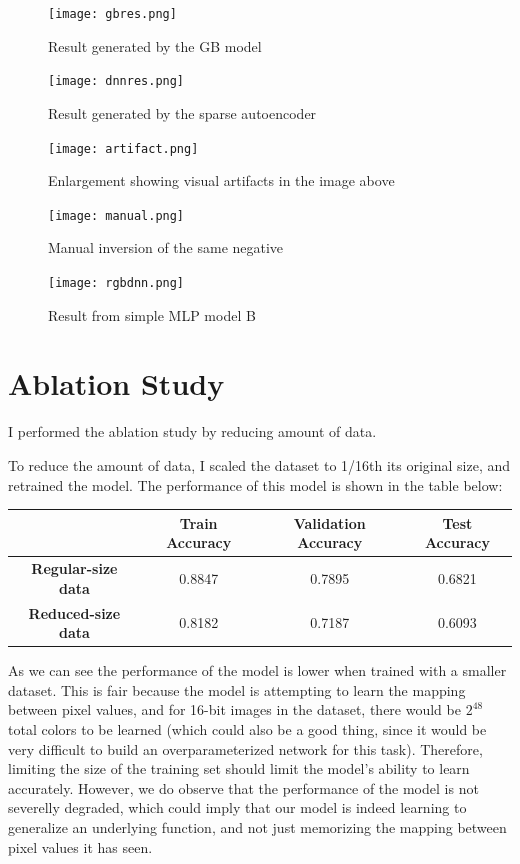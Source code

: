 \documentclass[twoside,11pt]{article}
\begin{document}
\begin{figure}
	\centering
	\texttt{[image: gbres.png]}
	\caption{Result generated by the GB model}
	\texttt{[image: dnnres.png]}
	\caption{Result generated by the sparse autoencoder}
	\texttt{[image: artifact.png]}
	\caption{Enlargement showing visual artifacts in the image above}
	\label{fig:res}
\end{figure}

\begin{figure}
	\centering
	\texttt{[image: manual.png]}
	\caption{Manual inversion of the same negative}
	\texttt{[image: rgbdnn.png]}
	\caption{Result from simple MLP model B}
\end{figure}
\section{Ablation Study}
\label{sec:ablation}
I performed the ablation study by reducing amount of data.

To reduce the amount of data, I scaled the dataset to 1/16th its original size, and retrained the model. 
The performance of this model is shown in the table below:

\begin{center}
	\begin{tabular}{ c|c|c|c }
	 &  \textbf{Train Accuracy}& \textbf{Validation Accuracy} & \textbf{Test Accuracy} \\
	 \hline
	 \textbf{Regular-size data} & 0.8847 & 0.7895 & 0.6821 \\  
	 \hline
	 \textbf{Reduced-size data} & 0.8182 & 0.7187 & 0.6093 \\

	\end{tabular}
	\end{center}

	As we can see the performance of the model is lower when trained with a smaller dataset. 
	This is fair because the model is attempting to learn the mapping between pixel values, and for 
	16-bit images in the dataset, there would be $2^{48}$ total colors to be learned 
	(which could also be a good thing, since it would be very difficult to build an overparameterized network for this task). 
	Therefore, limiting 
	the size of the training set should limit the model's ability to learn accurately. However, we do observe that the 
	performance of the model is not severelly degraded, which could imply that our model is indeed learning to generalize 
	an underlying function, and not just memorizing the mapping between pixel values it has seen.
\end{document}
